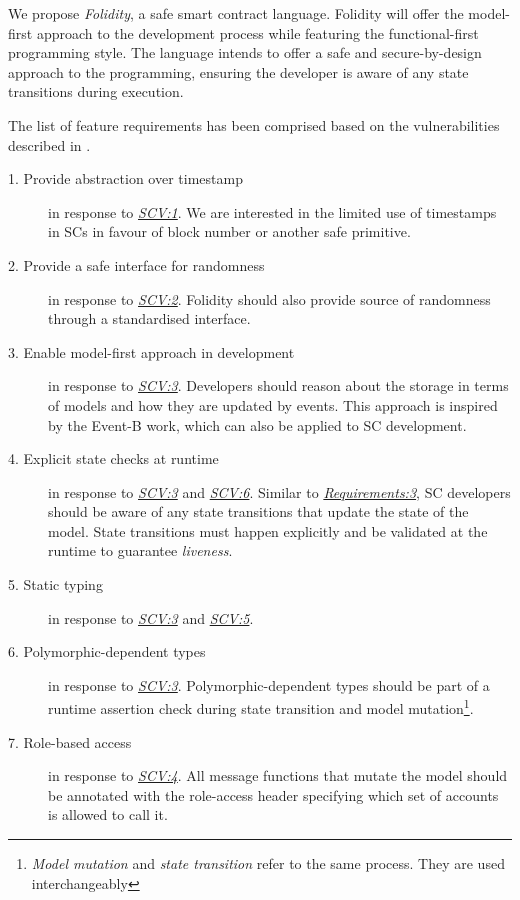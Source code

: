 \documentclass[oneside]{ecsproject}     %
\newcommand{\vref}[1]{\textit{\hyperref[#1]{#1}}}
\newcommand{\rref}[1]{\textit{\hyperref[#1]{#1}}}
\begin{document}
We propose \textit{Folidity}, a safe smart contract language. Folidity will offer the model-first approach to the development process
while featuring the functional-first programming style. The language intends to offer a safe and secure-by-design approach to the programming, 
ensuring the developer is aware of any state transitions during execution.

The list of feature requirements has been comprised based on the vulnerabilities described in .

\begin{description}
  \item[1. Provide abstraction over timestamp]\label{Requirements:1} in response to \vref{SCV:1}. We are interested in the limited use of timestamps in SCs in favour of block number or another safe primitive.
  \item[2. Provide a safe interface for randomness]\label{Requirements:2} in response to \vref{SCV:2}. Folidity should also provide source of randomness through a standardised interface.
  \item[3. Enable model-first approach in development]\label{Requirements:3} in response to \vref{SCV:3}. Developers should reason about the storage in terms of models and how they are updated by events. 
This approach is inspired by the Event-B\cite{event_b} work, which can also be applied to SC development.
  \item[4. Explicit state checks at runtime]\label{Requirements:4} in response to \vref{SCV:3} and \vref{SCV:6}. Similar to \rref{Requirements:3}, SC developers should be aware of any state transitions
that update the state of the model. State transitions must happen explicitly and be validated at the runtime to guarantee \textit{liveness}.
  \item[5. Static typing]\label{Requirements:5} in response to \vref{SCV:3} and \vref{SCV:5}.
  \item[6. Polymorphic-dependent types]\label{Requirements:6} in response to \vref{SCV:3}. Polymorphic-dependent types should be part of a runtime assertion check 
during state transition and model mutation\footnote{\textit{Model mutation} and \textit{state transition} refer to the same process. They are used interchangeably}.
  \item[7. Role-based access]\label{Requirements: 7} in response to \vref{SCV:4}. 
All message functions that mutate the model should be annotated with the role-access header specifying which set of accounts is allowed to call it.

\end{description}
\end{document}
